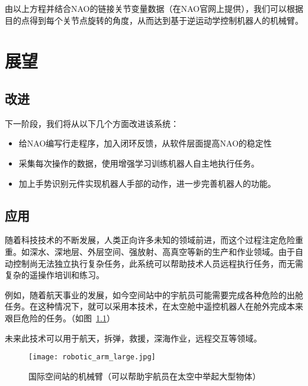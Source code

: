 由以上方程并结合NAO的链接关节变量数据（在NAO官网上提供），我们可以根据目的点得到每个关节点旋转的角度，从而达到基于逆运动学控制机器人的机械臂。


\chapter{展望}

\section{改进}
下一阶段，我们将从以下几个方面改进该系统：
\begin{itemize}
    \item 给NAO编写行走程序，加入闭环反馈，从软件层面提高NAO的稳定性
    \item 采集每次操作的数据，使用增强学习训练机器人自主地执行任务。
    \item 加上手势识别元件实现机器人手部的动作，进一步完善机器人的功能。
\end{itemize}

\section{应用}

随着科技技术的不断发展，人类正向许多未知的领域前进，而这个过程注定危险重重。如深水、深地层、外层空间、强放射、高真空等新的生产和作业领域。由于自动控制尚无法独立执行复杂任务，此系统可以帮助技术人员远程执行任务，而无需复杂的遥操作培训和练习。

例如，随着航天事业的发展，如今空间站中的宇航员可能需要完成各种危险的出舱任务。在这种情况下，就可以采用本技术，在太空舱中遥控机器人在舱外完成本来艰巨危险的任务。（如图~\ref{arm}）

未来此技术可以用于航天，拆弹，救援，深海作业，远程交互等领域。

\begin{figure}[htbp]
\small
\centering
\texttt{[image: robotic\_arm\_large.jpg]}
\caption{国际空间站的机械臂（可以帮助宇航员在太空中举起大型物体）} 
\label{arm}
\end{figure}

